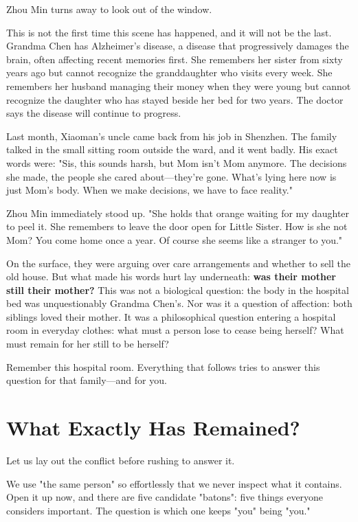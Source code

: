 Zhou Min turns away to look out of the window.

This is not the first time this scene has happened, and it will not be the last. Grandma Chen has Alzheimer's disease, a disease that progressively damages the brain, often affecting recent memories first. She remembers her sister from sixty years ago but cannot recognize the granddaughter who visits every week. She remembers her husband managing their money when they were young but cannot recognize the daughter who has stayed beside her bed for two years. The doctor says the disease will continue to progress.

Last month, Xiaoman's uncle came back from his job in Shenzhen. The family talked in the small sitting room outside the ward, and it went badly. His exact words were: "Sis, this sounds harsh, but Mom isn't Mom anymore. The decisions she made, the people she cared about---they're gone. What's lying here now is just Mom's body. When we make decisions, we have to face reality."

Zhou Min immediately stood up. "She holds that orange waiting for my daughter to peel it. She remembers to leave the door open for Little Sister. How is she not Mom? You come home once a year. Of course she seems like a stranger to you."

On the surface, they were arguing over care arrangements and whether to sell the old house. But what made his words hurt lay underneath: \textbf{was their mother still their mother?} This was not a biological question: the body in the hospital bed was unquestionably Grandma Chen's. Nor was it a question of affection: both siblings loved their mother. It was a philosophical question entering a hospital room in everyday clothes: what must a person lose to cease being herself? What must remain for her still to be herself?

Remember this hospital room. Everything that follows tries to answer this question for that family---and for you.

\section{What Exactly Has Remained?}
Let us lay out the conflict before rushing to answer it.

We use "the same person" so effortlessly that we never inspect what it contains. Open it up now, and there are five candidate "batons": five things everyone considers important. The question is which one keeps "you" being "you."

